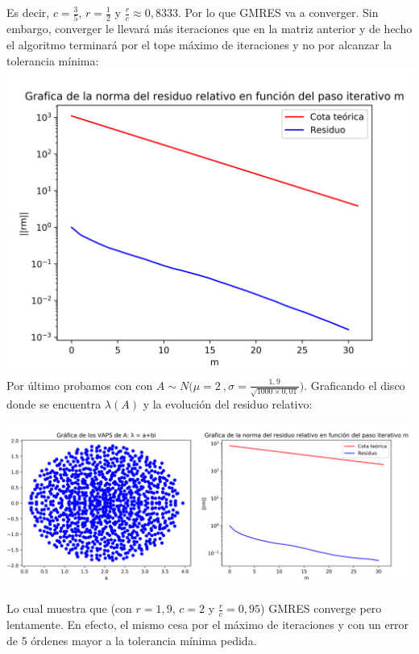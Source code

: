 \documentclass{endm}
\begin{document}
Es decir, $c=\frac{3}{5}$, $r=\frac{1}{2}$ y $\frac{r}{c} \approx 0,8333$. Por lo que GMRES va a converger. Sin embargo, converger le llevará más iteraciones que en la matriz anterior y de hecho el algoritmo terminará por el tope máximo de iteraciones y no por alcanzar la tolerancia mínima:
\includegraphics[scale=0.7]{residuo-5a.png}\\

Por último probamos con con $A \sim N \Bigg(\mu=2 \ ,\sigma=\frac{1,9}{\sqrt{1000 \times 0,01}}\Bigg)$. Graficando el disco donde se encuentra $\lambda(A)$ y la evolución del residuo relativo:

\begin{center}
    \includegraphics[scale=0.55]{snip2.PNG}\\
\end{center}

Lo cual muestra que (con $r=1,9$, $c=2$ y $\frac{r}{c}=0,95$) GMRES converge pero lentamente. En efecto, el mismo cesa por el máximo de iteraciones y con un error de 5 órdenes mayor a la tolerancia mínima pedida.
\end{document}
